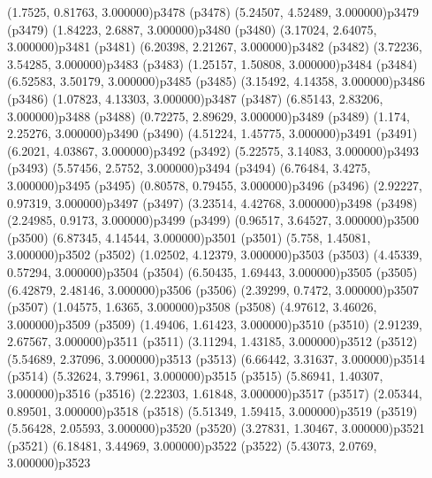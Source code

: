 \psPoint(1.7525, 0.81763, 3.000000){p3478}
\psdot(p3478)
\psPoint(5.24507, 4.52489, 3.000000){p3479}
\psdot(p3479)
\psPoint(1.84223, 2.6887, 3.000000){p3480}
\psdot(p3480)
\psPoint(3.17024, 2.64075, 3.000000){p3481}
\psdot(p3481)
\psPoint(6.20398, 2.21267, 3.000000){p3482}
\psdot(p3482)
\psPoint(3.72236, 3.54285, 3.000000){p3483}
\psdot(p3483)
\psPoint(1.25157, 1.50808, 3.000000){p3484}
\psdot(p3484)
\psPoint(6.52583, 3.50179, 3.000000){p3485}
\psdot(p3485)
\psPoint(3.15492, 4.14358, 3.000000){p3486}
\psdot(p3486)
\psPoint(1.07823, 4.13303, 3.000000){p3487}
\psdot(p3487)
\psPoint(6.85143, 2.83206, 3.000000){p3488}
\psdot(p3488)
\psPoint(0.72275, 2.89629, 3.000000){p3489}
\psdot(p3489)
\psPoint(1.174, 2.25276, 3.000000){p3490}
\psdot(p3490)
\psPoint(4.51224, 1.45775, 3.000000){p3491}
\psdot(p3491)
\psPoint(6.2021, 4.03867, 3.000000){p3492}
\psdot(p3492)
\psPoint(5.22575, 3.14083, 3.000000){p3493}
\psdot(p3493)
\psPoint(5.57456, 2.5752, 3.000000){p3494}
\psdot(p3494)
\psPoint(6.76484, 3.4275, 3.000000){p3495}
\psdot(p3495)
\psPoint(0.80578, 0.79455, 3.000000){p3496}
\psdot(p3496)
\psPoint(2.92227, 0.97319, 3.000000){p3497}
\psdot(p3497)
\psPoint(3.23514, 4.42768, 3.000000){p3498}
\psdot(p3498)
\psPoint(2.24985, 0.9173, 3.000000){p3499}
\psdot(p3499)
\psPoint(0.96517, 3.64527, 3.000000){p3500}
\psdot(p3500)
\psPoint(6.87345, 4.14544, 3.000000){p3501}
\psdot(p3501)
\psPoint(5.758, 1.45081, 3.000000){p3502}
\psdot(p3502)
\psPoint(1.02502, 4.12379, 3.000000){p3503}
\psdot(p3503)
\psPoint(4.45339, 0.57294, 3.000000){p3504}
\psdot(p3504)
\psPoint(6.50435, 1.69443, 3.000000){p3505}
\psdot(p3505)
\psPoint(6.42879, 2.48146, 3.000000){p3506}
\psdot(p3506)
\psPoint(2.39299, 0.7472, 3.000000){p3507}
\psdot(p3507)
\psPoint(1.04575, 1.6365, 3.000000){p3508}
\psdot(p3508)
\psPoint(4.97612, 3.46026, 3.000000){p3509}
\psdot(p3509)
\psPoint(1.49406, 1.61423, 3.000000){p3510}
\psdot(p3510)
\psPoint(2.91239, 2.67567, 3.000000){p3511}
\psdot(p3511)
\psPoint(3.11294, 1.43185, 3.000000){p3512}
\psdot(p3512)
\psPoint(5.54689, 2.37096, 3.000000){p3513}
\psdot(p3513)
\psPoint(6.66442, 3.31637, 3.000000){p3514}
\psdot(p3514)
\psPoint(5.32624, 3.79961, 3.000000){p3515}
\psdot(p3515)
\psPoint(5.86941, 1.40307, 3.000000){p3516}
\psdot(p3516)
\psPoint(2.22303, 1.61848, 3.000000){p3517}
\psdot(p3517)
\psPoint(2.05344, 0.89501, 3.000000){p3518}
\psdot(p3518)
\psPoint(5.51349, 1.59415, 3.000000){p3519}
\psdot(p3519)
\psPoint(5.56428, 2.05593, 3.000000){p3520}
\psdot(p3520)
\psPoint(3.27831, 1.30467, 3.000000){p3521}
\psdot(p3521)
\psPoint(6.18481, 3.44969, 3.000000){p3522}
\psdot(p3522)
\psPoint(5.43073, 2.0769, 3.000000){p3523}

